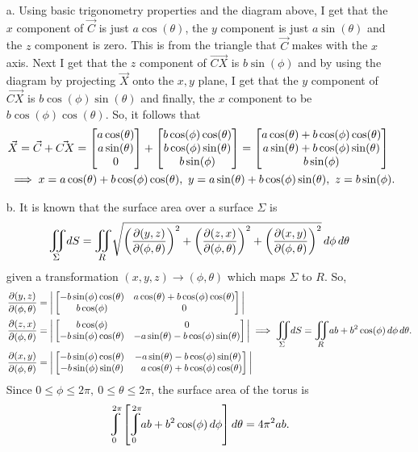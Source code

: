 \documentclass[titlepage]{article}
\begin{document}
\begin{solution}
\vspace{-2em}
\begin{itemize}
\item[a.]
Using basic trigonometry properties and the diagram above, I get that the $x$ component of $\vec{C}$ is just $a\cos(\theta)$, the $y$ component is just $a\sin(\theta)$ and the $z$ component is zero. This is from the triangle that $\vec{C}$ makes with the $x$ axis. Next I get that the $z$ component of $\vec{CX}$ is $b\sin(\phi)$ and by using the diagram by projecting $\vec{X}$ onto the $x,y$ plane, I get that the $y$ component of $\vec{CX}$ is  $b\cos(\phi)\sin(\theta)$ and finally, the $x$ component to be $b\cos(\phi)\cos(\theta)$.
So, it follows that
\begin{align*}
&\vec{X} = \vec{C} + \vec{CX} = \bmat{a\cos(\theta) \\ a\sin(\theta) \\ 0} + \bmat{b\cos(\phi)\cos(\theta) \\ b\cos(\phi)\sin(\theta) \\ b\sin(\phi)} = \bmat{a\cos(\theta) + b\cos(\phi)\cos(\theta) \\  a\sin(\theta) + b\cos(\phi)\sin(\theta) \\   b\sin(\phi)} \\
&\implies x = a\cos(\theta) + b\cos(\phi)\cos(\theta), \ y = a\sin(\theta) + b \cos(\phi)\sin(\theta), \ z = b\sin(\phi).
\end{align*}
\item[b.] It is known that the surface area over a surface $\Sigma$ is
$$\bigiint{\Sigma}{}dS = \bigiint{R}{}\sqrt{\left(\frac{\p(y,z)}{\p(\phi,\theta)}\right)^2 + {\left(\frac{\p(z,x)}{\p(\phi,\theta)}\right)}^2 +  \left(\frac{\p(x,y)}{\p(\phi,\theta)}\right)^2} \,d\phi\,d\theta$$
given a transformation $(x,y,z) \rightarrow (\phi,\theta)$ which maps $\Sigma$ to $R$.
So,
\begin{align*}
\frac{\p(y,z)}{\p(\phi,\theta)} &= \bigg|\bmat{ -b\sin(\phi)\cos(\theta) & a\cos(\theta) + b\cos(\phi)\cos(\theta) \\ b\cos(\phi) & 0 }\bigg|\\
\frac{\p(z,x)}{\p(\phi,\theta)} &= \bigg|\bmat{b\cos(\phi) & 0 \\ -b\sin(\phi)\cos(\theta) & -a\sin(\theta) - b\cos(\phi)\sin(\theta) }\bigg| \implies \bigiint{\Sigma}{}dS = \bigiint{R}{}ab+b^2\cos(\phi)\,d\phi\,d\theta. \\
\frac{\p(x,y)}{\p(\phi,\theta)} &= \bigg|\bmat{ -b\sin(\phi)\cos(\theta) & -a\sin(\theta) - b\cos(\phi)\sin(\theta)  \\ -b\sin(\phi)\sin(\theta) & \phantom{-}a\cos(\theta) + b\cos(\phi)\cos(\theta)}\bigg|
\end{align*}
Since $0\leq \phi \leq 2\pi, \ 0\leq\theta\leq 2\pi$, the surface area of the torus is
$$\mlvarint\limits_{0}^{2\pi} \left[\mlvarint\limits_{0}^{2\pi} ab+b^2\cos(\phi)\,d\phi\right]d\theta = 4\pi^2ab.$$
\end{itemize}
\end{solution}
\end{document}
